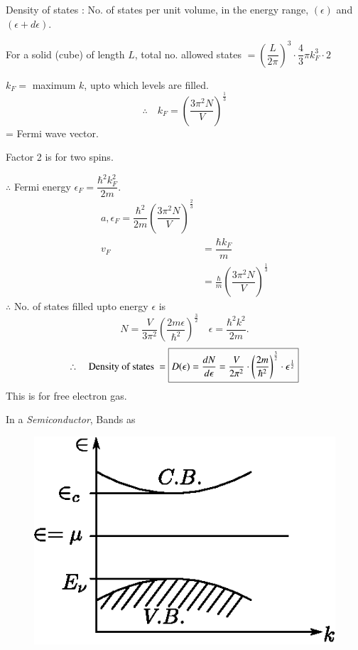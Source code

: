 \vfill\eject

Density of states : No. of states per unit volume, in the energy range, $(\epsilon)$ and $(\epsilon+d\epsilon)$.

For a solid (cube) of length $L$, total no. allowed states $=\left(\dfrac{L}{2\pi}\right)^{3}\cdot\dfrac{4}{3}\pi k^{3}_{F}\cdot 2$

$k_{F}=$ maximum $k$, upto which levels are filled.
$$
\therefore\quad k_{F}=\left(\dfrac{3\pi^{2}N}{V}\right)^{\frac{1}{3}}
$$
= Fermi wave vector.

Factor 2 is for two spins.

$\therefore$ Fermi energy $\epsilon_{F}=\dfrac{\hbar^{2}k^{2}_{F}}{2m}$.
\begin{align*}
a, \epsilon_{F}=\dfrac{\hbar^{2}}{2m}\left(\dfrac{3\pi^{2}N}{V}\right)^{\frac{2}{3}}\\
v_{F} &= \dfrac{\hbar k_{F}}{m}\\
&= \frac{\hbar}{m}\left(\dfrac{3\pi^{2}N}{V}\right)^{\frac{1}{3}}
\end{align*}
$\therefore$ No. of states filled upto energy $\epsilon$ is
$$
N=\dfrac{V}{3\pi^{2}}\left(\dfrac{2m\epsilon}{\hbar^{2}}\right)^{\frac{3}{2}}\quad \epsilon=\dfrac{\hbar^{2}k^{2}}{2m}.
$$
$$
\therefore\quad \text{Density of states } = \fbox{$D(\epsilon)=\dfrac{dN}{d\epsilon}=\dfrac{V}{2\pi^{2}}\cdot \left(\dfrac{2m}{\hbar^{2}}\right)^{\frac{3}{2}}\cdot \epsilon^{\frac{1}{2}}$}
$$
This is for free electron gas.

In a {\em Semiconductor}, Bands as
\begin{figure}[H]
\centering
\includegraphics[scale=.85]{images/lecture23/fig7.eps}
\end{figure}

